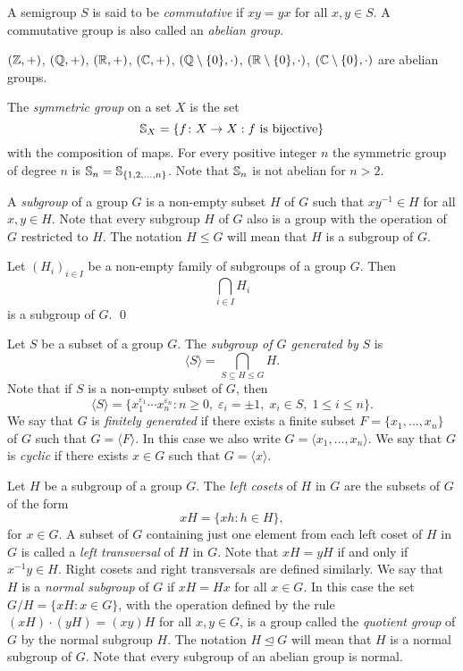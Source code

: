 A semigroup $S$ is said to be {\em commutative} if $xy=yx$ for all $x,y\in S$. A commutative group is also called an {\em abelian group}.

\begin{example}
 $(\mathbb{Z}, +)$,  $(\mathbb{Q}, +)$, $(\mathbb{R}, +)$, $(\mathbb{C}, +)$, $(\mathbb{Q}\setminus\{0\}, \cdot)$, $(\mathbb{R}\setminus\{0\}, \cdot)$, 
	$(\mathbb{C}\setminus\{0\}, \cdot)$ are abelian groups.
\end{example}

\begin{example}
The {\em symmetric group} on a set $X$ is the set 
\[
\mathbb{S}_X=\{ f\colon X\rightarrow X: f \mbox{ is bijective}\}
\]
with the composition of maps. For every positive integer $n$ the symmetric group of degree $n$ is
$\mathbb{S}_n=\mathbb{S}_{\{ 1,2,\dots ,n\}}$. Note that $\mathbb{S}_n$ is not abelian for $n>2$.
\end{example}    

A {\em subgroup} of a group $G$ is a non-empty subset $H$ of $G$ such that $xy^{-1}\in H$ for all $x,y\in H$. 
Note that every subgroup $H$ of $G$ also is a group with the operation of $G$ restricted to $H$.
The notation $H\leq G$ will mean that $H$ is a subgroup of $G$.

\begin{proposition}
\label{intersection}
	Let $(H_i)_{i\in I}$ be a non-empty family of subgroups of a group $G$. Then 
	\[ 
	\bigcap_{i\in I}H_i 
	\]
    is a subgroup of $G$. \qed
\end{proposition}   

Let $S$ be a subset of a group $G$. The \emph{subgroup of $G$ generated by} 
$S$ is
\[
\langle S\rangle=\bigcap_{S\subseteq H\leq G}H.
\]
Note that if $S$ is a non-empty subset of $G$, then
\[
\langle S\rangle=\{ x_1^{\varepsilon_1}\cdots x_n^{\varepsilon_n}: n\geq0,\; \varepsilon_i=\pm 1,\; x_i\in S,\; 1\leq i\leq n \}.
\]
We say that $G$ is {\em finitely generated} if there exists a finite subset $F=\{ x_1,\dots ,x_n\}$ of $G$ such that $G=\langle F\rangle$. In this case we also write $G=\langle x_1,\dots ,x_n\rangle$.  
We say that $G$ is {\em cyclic} if there exists $x\in G$ such that $G=\langle x\rangle$. 

Let $H$ be a subgroup of a group $G$. The {\em left cosets} of $H$ in $G$ are 
the subsets of $G$ of the form
\[
xH=\{ xh: h\in H\},
\]
for $x\in G$. A subset of $G$ containing just one element from each left coset of $H$ in $G$ is called a {\em left transversal} of $H$ in $G$. 
Note that $xH=yH$ if and only if $x^{-1}y\in H$.
Right cosets and right transversals are defined similarly.
We say that $H$ is a {\em normal subgroup} of $G$ if $xH=Hx$ for all $x\in G$. 
In this case the set
$G/H=\{xH: x\in G\}$, with the operation defined by the rule $(xH)\cdot (yH)=(xy)H$ for all $x,y\in G$, 
is a group called the {\em quotient group} of $G$ by the normal subgroup $H$. 
The notation $H\unlhd G$ will mean that $H$ is a normal subgroup of $G$.
Note that every subgroup of an abelian group is normal.


